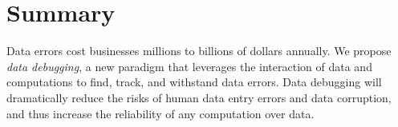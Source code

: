 \section{Summary}


Data errors cost businesses millions to billions of dollars annually.
We propose \emph{data debugging}, a new paradigm that leverages
the interaction of data and computations to find, track, and withstand
data errors. Data debugging will dramatically reduce the risks of
human data entry errors and data corruption, and thus increase the reliability
of any computation over data.


